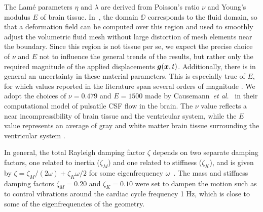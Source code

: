 \documentclass{template}
\begin{document}
The Lamé parameters $\eta$ and $\lambda$ are derived from
Poisson's ratio $\nu$ and Young's modulus $E$ of brain tissue.
In~, the domain $\DD$
corresponds to the fluid domain, so that a deformation field
can be computed over this region and used to smoothly
adjust the volumetric fluid mesh without large distortion
of mesh elements near the boundary. 
Since this region is not tissue per se,
we expect the precise choice of $\nu$ and $E$ not to
influence the general trends of the results, but rather
only the required magnitude of the applied displacements $\bm{g}(\bm{x}, t)$.
Additionally, there is in general an uncertainty
in these material parameters. This is especially true of $E$, 
for which values reported in the literature span several orders of magnitude
\citep{Budday2015Mechanical, Cheng2010ComputationalModel,
Cheng2007UnconfinedCompression, Sweetman2011ThreeDimensional}.
We adopt the choices of $\nu=0.479$ and $E=1500$
made by Causemann~\emph{et al.}~\citep{Causemann2022HumanFramework}
in their computational model of pulsatile CSF flow in the brain. The $\nu$ value 
reflects a near incompressibility of brain tissue and the ventricular system,
while the $E$ value represents an average of
gray and white matter brain tissue surrounding the ventricular system
\citep{Budday2015Mechanical}. 

In general, the total Rayleigh damping factor $\zeta$ depends on
two separate damping factors, one related to inertia ($\zeta_M$)
and one related to stiffness ($\zeta_K$), and is given by
$\zeta = \zeta_M / (2\omega) + \zeta_K\omega / 2$
for some eigenfrequency $\omega$~\citep{ChopraAnilK2007Dynamics}.
The mass and stiffness damping factors
$\zeta_M = 0.20$ and $\zeta_K = 0.10$ were set to dampen the motion
such as to control vibrations around the cardiac cycle frequency 1 Hz,
which is close to some of the eigenfrequencies of the geometry.
\end{document}
